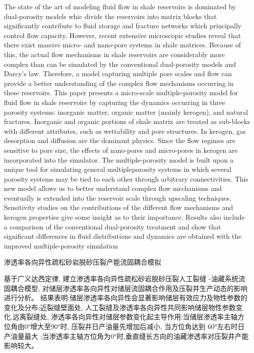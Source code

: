 \documentclass{article}
\begin{document}
The state of the art of modeling fluid flow in shale reservoirs is dominated by dual-porosity models whic divide the reservoirs into matrix blocks that significantly contribute to fluid storage and fracture networks which principally control flow capacity. However, recent extensive microscopic studies reveal that there exist massive micro- and nano-pore systems in shale matrices. Because of this, the actual flow mechanisms in shale reservoirs are considerably more complex than can be simulated by the conventional dual-porosity models and Darcy’s law. Therefore, a model capturing multiple pore scales and flow can provide a better understanding of the complex flow mechanisms occurring in these reservoirs. This paper presents a micro-scale multiple-porosity model for fluid flow in shale reservoirs by capturing the dynamics occurring in three porosity systems: inorganic matter, organic matter (mainly kerogen), and natural fractures. Inorganic and organic portions of shale matrix are treated as sub-blocks with different attributes, such as wettability and pore structures. In kerogen, gas desorption and diffusion are the dominant physics. Since the flow regimes are sensitive to pore size, the effects of nano-pores and micro-pores in kerogen are incorporated into the simulator. The multiple-porosity model is built upon a unique tool for simulating general multipleporosity systems in which several porosity systems may be tied to each other through arbitrary connectivities. This new model allows us to better understand complex flow mechanisms and eventually is extended into the reservoir scale through upscaling techniques. Sensitivity studies on the contributions of the different flow mechanisms and kerogen properties give some insight as to their importance. Results also include a comparison of the conventional dual-porosity treatment and show that significant differences in fluid distributions and dynamics are obtained with the improved multiple-porosity simulation

渗透率各向异性疏松砂岩脱砂压裂产能流固耦合模拟

基于广义达西定律, 建立渗透率各向异性疏松砂岩脱砂压裂人工裂缝 -油藏系统流固耦合模型, 对储层渗透率各向异性对储层流固耦合作用及压裂井生产动态的影响进行分析。 结果表明:储层渗透率各向异性会显著影响储层有效应力及物性参数的变化及分布;近裂缝壁面处, 人工裂缝及渗透率各向异性共同影响储层物性参数变化,远离裂缝处, 渗透率各向异性对储层参数变化起主导作用;当储层渗透率主轴方位角由0°增大至90°时, 压裂井日产油量先增加后减小, 当方位角达到 60°左右时日产油量最大 ;当渗透率主轴方位角为0°时,垂直缝长方向的油藏渗透率对压裂井产能影响较大。
\end{document}
